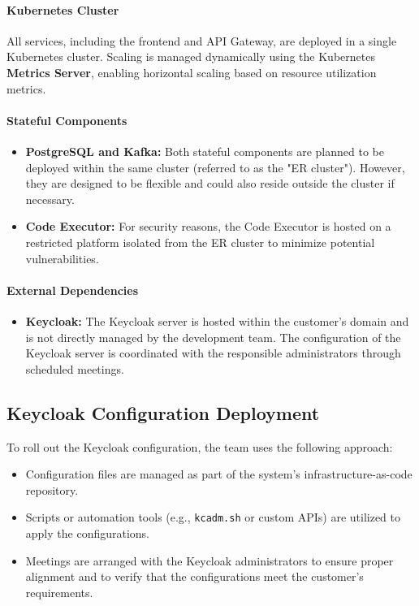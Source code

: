 \paragraph{Kubernetes Cluster}  
All services, including the frontend and API Gateway, are deployed in a single Kubernetes cluster. Scaling is managed dynamically using the Kubernetes \textbf{Metrics Server}, enabling horizontal scaling based on resource utilization metrics.

\paragraph{Stateful Components}  
\begin{itemize}
    \item \textbf{PostgreSQL and Kafka:} Both stateful components are planned to be deployed within the same cluster (referred to as the "ER cluster"). However, they are designed to be flexible and could also reside outside the cluster if necessary.
    \item \textbf{Code Executor:} For security reasons, the Code Executor is hosted on a restricted platform isolated from the ER cluster to minimize potential vulnerabilities.
\end{itemize}

\paragraph{External Dependencies}  
\begin{itemize}
    \item \textbf{Keycloak:} The Keycloak server is hosted within the customer's domain and is not directly managed by the development team. The configuration of the Keycloak server is coordinated with the responsible administrators through scheduled meetings.
\end{itemize}

\subsection{Keycloak Configuration Deployment}
To roll out the Keycloak configuration, the team uses the following approach:
\begin{itemize}
    \item Configuration files are managed as part of the system's infrastructure-as-code repository.
    \item Scripts or automation tools (e.g., \texttt{kcadm.sh} or custom APIs) are utilized to apply the configurations.
    \item Meetings are arranged with the Keycloak administrators to ensure proper alignment and to verify that the configurations meet the customer's requirements.
\end{itemize}